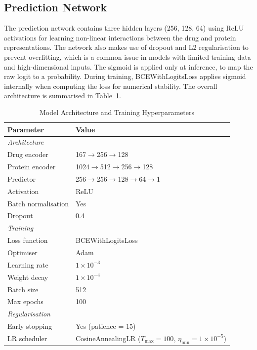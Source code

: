 \subsection{Prediction Network}
\label{subsec:-prediction_network}
The prediction network contains three hidden layers (256, 128, 64) using ReLU activations for learning non-linear interactions between the drug and protein representations.
The network also makes use of dropout and L2 regularisation to prevent overfitting, which is a common issue in models with limited training data and high-dimensional inputs.
The sigmoid is applied only at inference, to map the raw logit to a probability.
During training, BCEWithLogitsLoss applies sigmoid internally when computing the loss for numerical stability.
The overall architecture is summarised in Table~\ref{tab:network_structure}.
\begin{table}[H]
\centering
\caption{Model Architecture and Training Hyperparameters}
\label{tab:network_structure}
\begin{tabular}{ll}
\toprule
\textbf{Parameter} & \textbf{Value} \\
\midrule
\textit{Architecture} \\
\quad Drug encoder         & 167$\rightarrow$256$\rightarrow$128 \\
\quad Protein encoder      & 1024$\rightarrow$512$\rightarrow$256$\rightarrow$128 \\
\quad Predictor            & 256$\rightarrow$256$\rightarrow$128$\rightarrow$64$\rightarrow$1 \\
\quad Activation           & ReLU \\
\quad Batch normalisation  & Yes \\
\quad Dropout              & 0.4 \\
\midrule
\textit{Training} \\
\quad Loss function        & BCEWithLogitsLoss \\
\quad Optimiser            & Adam \\
\quad Learning rate        & $1\times10^{-3}$ \\
\quad Weight decay         & $1\times10^{-4}$ \\
\quad Batch size           & 512 \\
\quad Max epochs           & 100 \\
\midrule
\textit{Regularisation} \\
\quad Early stopping       & Yes (patience = 15) \\
\quad LR scheduler         & CosineAnnealingLR ($T_{\max}=100$, $\eta_{\min}=1\times10^{-5}$) \\
\bottomrule
\end{tabular}
\end{table}

